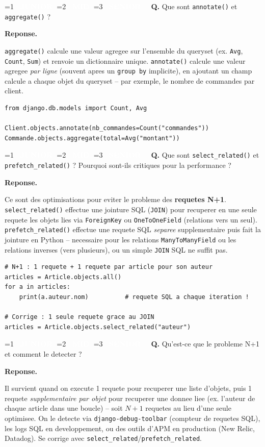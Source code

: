 \documentclass[11pt,a4paper]{article}
\newcommand{\badgeJ}{\textcolor{white}{\colorbox{junior}{\small\bfseries\ JUNIOR\ }}}
\newcommand{\badgeM}{\textcolor{white}{\colorbox{mid}{\small\bfseries\ MID\ }}}
\newcommand{\badgeS}{\textcolor{white}{\colorbox{senior}{\small\bfseries\ SENIOR\ }}}
\newcounter{qcount}
\newenvironment{qa}[2]{%
  \stepcounter{qcount}%
  \par\vspace{6pt}%
  \noindent\colorbox{qbg}{\parbox{\dimexpr\linewidth-12pt}{\vspace{2pt}%
  \ifnum#1=1 \badgeJ\fi\ifnum#1=2 \badgeM\fi\ifnum#1=3 \badgeS\fi
  \ \textbf{Q\theqcount.} #2\vspace{2pt}}}\par\vspace{4pt}%
  \noindent\textbf{\color{accent}Reponse.}\ \ignorespaces
}{%
  \par\vspace{8pt}%
}
\begin{document}
\begin{qa}{2}{Que sont \texttt{annotate()} et \texttt{aggregate()} ?}
\texttt{aggregate()} calcule une valeur agregee sur l'ensemble du queryset
(ex. \texttt{Avg}, \texttt{Count}, \texttt{Sum}) et renvoie un dictionnaire
unique. \texttt{annotate()} calcule une valeur agregee \emph{par ligne}
(souvent apres un \texttt{group by} implicite), en ajoutant un champ calcule a
chaque objet du queryset -- par exemple, le nombre de commandes par client.
\begin{lstlisting}
from django.db.models import Count, Avg

Client.objects.annotate(nb_commandes=Count("commandes"))
Commande.objects.aggregate(total=Avg("montant"))
\end{lstlisting}
\end{qa}

\begin{qa}{2}{Que sont \texttt{select\_related()} et \texttt{prefetch\_related()} ? Pourquoi sont-ils critiques pour la performance ?}
Ce sont des optimisations pour eviter le probleme des \textbf{requetes N+1}.
\texttt{select\_related()} effectue une jointure SQL (\texttt{JOIN}) pour
recuperer en une seule requete les objets lies via \texttt{ForeignKey} ou
\texttt{OneToOneField} (relations \og{}vers un seul\fg{}).
\texttt{prefetch\_related()} effectue une requete SQL \emph{separee}
supplementaire puis fait la jointure en Python -- necessaire pour les relations
\texttt{ManyToManyField} ou les relations inverses (\og{}vers plusieurs\fg{}),
ou un simple \texttt{JOIN} SQL ne suffit pas.
\begin{lstlisting}
# N+1 : 1 requete + 1 requete par article pour son auteur
articles = Article.objects.all()
for a in articles:
    print(a.auteur.nom)          # requete SQL a chaque iteration !

# Corrige : 1 seule requete grace au JOIN
articles = Article.objects.select_related("auteur")
\end{lstlisting}
\end{qa}

\begin{qa}{2}{Qu'est-ce que le probleme N+1 et comment le detecter ?}
Il survient quand on execute 1 requete pour recuperer une liste d'objets, puis
1 requete \emph{supplementaire par objet} pour recuperer une donnee liee
(ex. l'auteur de chaque article dans une boucle) -- soit $N+1$ requetes au
lieu d'une seule optimisee. On le detecte via \texttt{django-debug-toolbar}
(compteur de requetes SQL), les logs SQL en developpement, ou des outils
d'APM en production (New Relic, Datadog). Se corrige avec
\texttt{select\_related}/\texttt{prefetch\_related}.
\end{qa}
\end{document}
